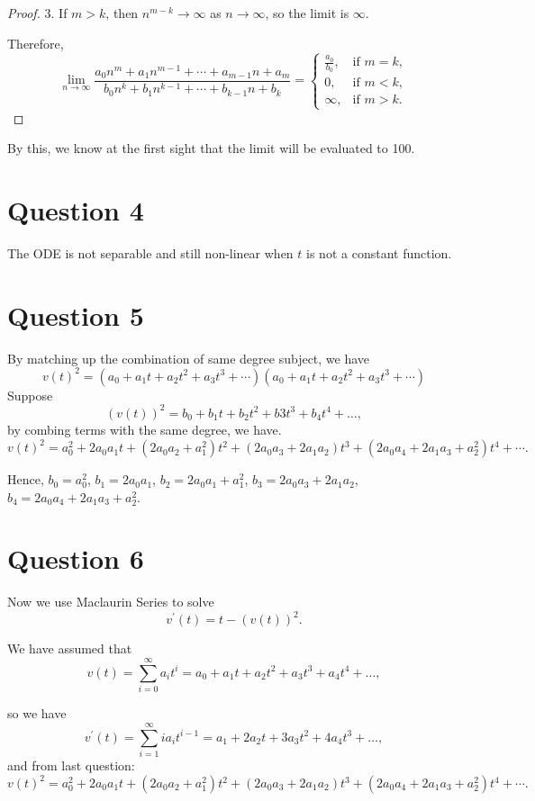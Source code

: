 \documentclass[12pt,a4paper]{article}
\begin{document}
\begin{remark}
\begin{proof}
3. If \(m > k\), then \(n^{m-k} \to \infty\) as \(n \to \infty\), so the limit is \(\infty\).

Therefore,
\[
\lim_{n \to \infty} \frac{a_0 n^m + a_1 n^{m-1} + \cdots + a_{m-1} n + a_m}{b_0 n^k + b_1 n^{k-1} + \cdots + b_{k-1} n + b_k} = 
\begin{cases} 
\frac{a_0}{b_0}, & \text{if } m = k, \\
0, & \text{if } m < k, \\
\infty, & \text{if } m > k.
\end{cases}
\]
\end{proof}

By this, we know at the first sight that the limit will be evaluated to 100.
\end{remark}

\section*{Question 4}
The ODE is not separable and still non-linear when $t$ is not a constant function.




\section*{Question 5}
By matching up the combination of same degree subject, we have
\[
v(t)^2=\left(a_0+a_1 t+a_2 t^2+a_3 t^3+\cdots\right)\left(a_0+a_1 t+a_2 t^2+a_3 t^3+\cdots\right)
\]
Suppose 
\[
(v(t))^2=b_0+b_1 t+b_2 t^2+b 3 t^3+b_4 t^4+\ldots,
\]
by combing terms with the same degree, we have.
\[
v(t)^2=a_0^2+2 a_0 a_1 t+\left(2 a_0 a_2+a_1^2\right) t^2+\left(2 a_0 a_3+2 a_1 a_2\right) t^3+\left(2 a_0 a_4+2 a_1 a_3+a_2^2\right) t^4+\cdots.
\]

Hence, $b_0 = a_0^2$, $b_1=2a_0a_1$, $b_2=2a_0a_1+a_1^2$, $b_3=2 a_0 a_3+2 a_1 a_2$,
$b_4=2 a_0 a_4+2 a_1 a_3+a_2^2$.


\section*{Question 6}
Now we use Maclaurin Series to solve
\[
v^{\prime}(t)=t-(v(t))^2.
\]

We have assumed that 
\begin{equation}\label{w12:vt}
v(t)= \sum_{i=0}^{\infty}a_i t^i = a_0+a_1 t+a_2 t^2+a_3 t^3+a_4 t^4+\ldots,
\end{equation}

so we have
\begin{equation}\label{w12:vpt}
v^\prime (t) = \sum_{i=1}^{\infty}ia_it^{i-1} = a_1+ 2a_2 t + 3a_3 t^2 + 4a_4 t^3+\ldots,
\end{equation}
and from last question:
\[
v(t)^2=a_0^2+2 a_0 a_1 t+\left(2 a_0 a_2+a_1^2\right) t^2+\left(2 a_0 a_3+2 a_1 a_2\right) t^3+\left(2 a_0 a_4+2 a_1 a_3+a_2^2\right) t^4+\cdots.
\]
\end{document}
